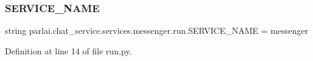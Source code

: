 \subsubsection{\texorpdfstring{S\+E\+R\+V\+I\+C\+E\+\_\+\+N\+A\+ME}{SERVICE\_NAME}}
{\footnotesize\ttfamily string parlai.\+chat\+\_\+service.\+services.\+messenger.\+run.\+S\+E\+R\+V\+I\+C\+E\+\_\+\+N\+A\+ME = \textquotesingle{}messenger\textquotesingle{}}



Definition at line 14 of file run.\+py.

